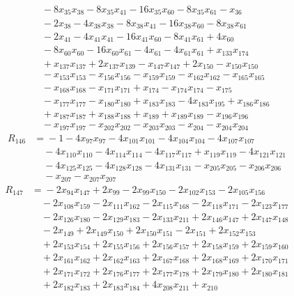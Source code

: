 \begin{align*}
&\quad{}-8x_{35}x_{38} -8x_{35}x_{41} -16x_{35}x_{60} -8x_{35}x_{61} -x_{36}\\
&\quad{}-2x_{38} -4x_{38}x_{38} -8x_{38}x_{41} -16x_{38}x_{60} -8x_{38}x_{61}\\
&\quad{}-2x_{41} -4x_{41}x_{41} -16x_{41}x_{60} -8x_{41}x_{61} +4x_{60}\\
&\quad{}-8x_{60}x_{60} -16x_{60}x_{61} -4x_{61} -4x_{61}x_{61} +x_{133}x_{174}\\
&\quad{}+x_{137}x_{137} +2x_{137}x_{139} -x_{147}x_{147} +2x_{150} -x_{150}x_{150}\\
&\quad{}-x_{153}x_{153} -x_{156}x_{156} -x_{159}x_{159} -x_{162}x_{162} -x_{165}x_{165}\\
&\quad{}-x_{168}x_{168} -x_{171}x_{171} +x_{174} -x_{174}x_{174} -x_{175}\\
&\quad{}-x_{177}x_{177} -x_{180}x_{180} +x_{183}x_{183} -4x_{183}x_{195} +x_{186}x_{186}\\
&\quad{}+x_{187}x_{187} +x_{188}x_{188} +x_{189} +x_{189}x_{189} -x_{196}x_{196}\\
&\quad{}-x_{197}x_{197} -x_{202}x_{202} -x_{203}x_{203} -x_{204} -x_{204}x_{204}
\end{align*}
\begin{align*}
R_{146}&={}-1 -4x_{97}x_{97} -4x_{101}x_{101} -4x_{104}x_{104} -4x_{107}x_{107}\\
&\quad{}-4x_{110}x_{110} -4x_{114}x_{114} -4x_{117}x_{117} +x_{119}x_{119} -4x_{121}x_{121}\\
&\quad{}-4x_{125}x_{125} -4x_{128}x_{128} -4x_{131}x_{131} -x_{205}x_{205} -x_{206}x_{206}\\
&\quad{}-x_{207} -x_{207}x_{207}
\end{align*}
\begin{align*}
R_{147}&={}-2x_{94}x_{147} +2x_{99} -2x_{99}x_{150} -2x_{102}x_{153} -2x_{105}x_{156}\\
&\quad{}-2x_{108}x_{159} -2x_{111}x_{162} -2x_{115}x_{168} -2x_{118}x_{171} -2x_{123}x_{177}\\
&\quad{}-2x_{126}x_{180} -2x_{129}x_{183} -2x_{133}x_{211} +2x_{146}x_{147} +2x_{147}x_{148}\\
&\quad{}-2x_{149} +2x_{149}x_{150} +2x_{150}x_{151} -2x_{151} +2x_{152}x_{153}\\
&\quad{}+2x_{153}x_{154} +2x_{155}x_{156} +2x_{156}x_{157} +2x_{158}x_{159} +2x_{159}x_{160}\\
&\quad{}+2x_{161}x_{162} +2x_{162}x_{163} +2x_{167}x_{168} +2x_{168}x_{169} +2x_{170}x_{171}\\
&\quad{}+2x_{171}x_{172} +2x_{176}x_{177} +2x_{177}x_{178} +2x_{179}x_{180} +2x_{180}x_{181}\\
&\quad{}+2x_{182}x_{183} +2x_{183}x_{184} +4x_{208}x_{211} +x_{210}
\end{align*}
